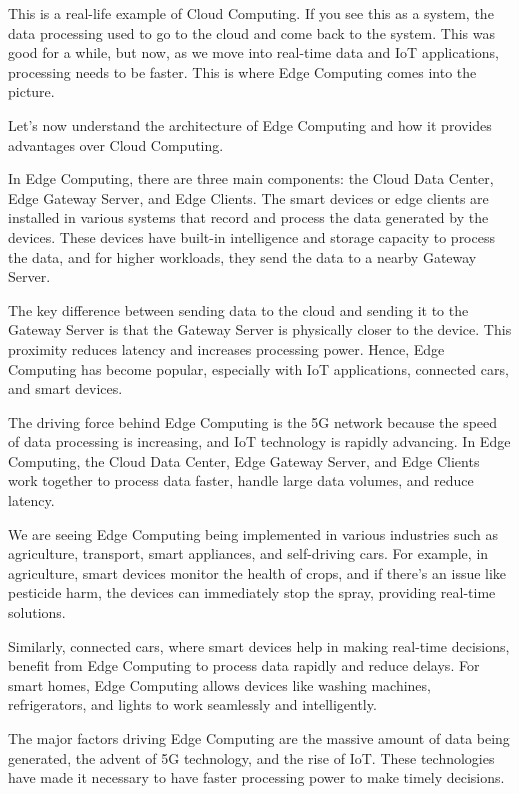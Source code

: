 \documentclass{article}
\begin{document}
This is a real-life example of Cloud Computing. If you see this as a system, the data processing used to go to the cloud and come back to the system. This was good for a while, but now, as we move into real-time data and IoT applications, processing needs to be faster. This is where Edge Computing comes into the picture.

Let’s now understand the architecture of Edge Computing and how it provides advantages over Cloud Computing.

In Edge Computing, there are three main components: the Cloud Data Center, Edge Gateway Server, and Edge Clients. The smart devices or edge clients are installed in various systems that record and process the data generated by the devices. These devices have built-in intelligence and storage capacity to process the data, and for higher workloads, they send the data to a nearby Gateway Server.

The key difference between sending data to the cloud and sending it to the Gateway Server is that the Gateway Server is physically closer to the device. This proximity reduces latency and increases processing power. Hence, Edge Computing has become popular, especially with IoT applications, connected cars, and smart devices.

The driving force behind Edge Computing is the 5G network because the speed of data processing is increasing, and IoT technology is rapidly advancing. In Edge Computing, the Cloud Data Center, Edge Gateway Server, and Edge Clients work together to process data faster, handle large data volumes, and reduce latency.

We are seeing Edge Computing being implemented in various industries such as agriculture, transport, smart appliances, and self-driving cars. For example, in agriculture, smart devices monitor the health of crops, and if there's an issue like pesticide harm, the devices can immediately stop the spray, providing real-time solutions.

Similarly, connected cars, where smart devices help in making real-time decisions, benefit from Edge Computing to process data rapidly and reduce delays. For smart homes, Edge Computing allows devices like washing machines, refrigerators, and lights to work seamlessly and intelligently.

The major factors driving Edge Computing are the massive amount of data being generated, the advent of 5G technology, and the rise of IoT. These technologies have made it necessary to have faster processing power to make timely decisions.
\end{document}
